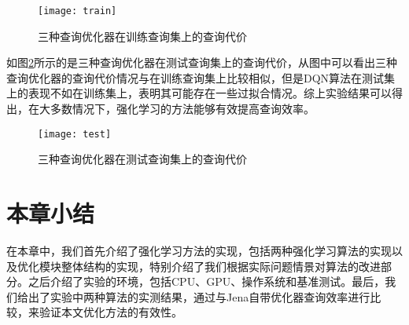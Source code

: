 \begin{figure}[h]
    \centering
    \texttt{[image: train]}
    \caption{三种查询优化器在训练查询集上的查询代价}
    \label{train}
\end{figure}

如图\ref{test}所示的是三种查询优化器在测试查询集上的查询代价，从图中可以看出三种查询优化器的查询代价情况与在训练查询集上比较相似，但是DQN算法在测试集上的表现不如在训练集上，表明其可能存在一些过拟合情况。综上实验结果可以得出，在大多数情况下，强化学习的方法能够有效提高查询效率。
\begin{figure}[h]
    \centering
    \texttt{[image: test]}
    \caption{三种查询优化器在测试查询集上的查询代价}
    \label{test}
\end{figure}

\section{本章小结}
在本章中，我们首先介绍了强化学习方法的实现，包括两种强化学习算法的实现以及优化模块整体结构的实现，特别介绍了我们根据实际问题情景对算法的改进部分。之后介绍了实验的环境，包括CPU、GPU、操作系统和基准测试。最后，我们给出了实验中两种算法的实测结果，通过与Jena自带优化器查询效率进行比较，来验证本文优化方法的有效性。
